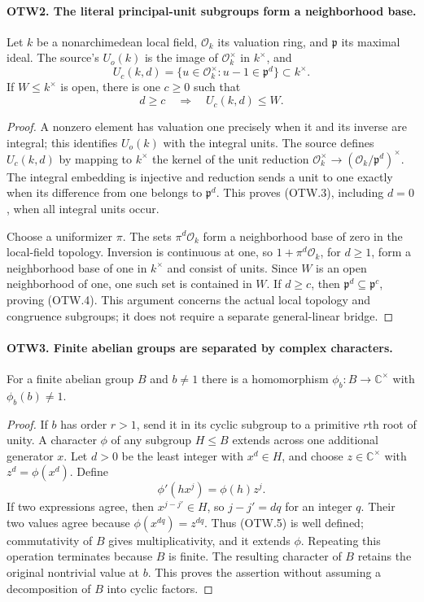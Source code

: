 \paragraph{OTW2. The literal principal-unit subgroups form a neighborhood base.}
\label{claim:OTW2}
Let $k$ be a nonarchimedean local field, $\mathcal O_k$ its valuation
ring, and $\mathfrak p$ its maximal ideal.  The source's $U_o(k)$
is the image of $\mathcal O_k^\times$ in $k^\times$, and
\[
 U_c(k,d)=\{u\in\mathcal O_k^\times:u-1\in\mathfrak p^d\}
                  \subset k^\times.                 \tag{OTW.3}
\]
If $W\leq k^\times$ is open, there is one $c\geq0$ such that
\[
                d\geq c\quad\Longrightarrow\quad U_c(k,d)\leq W.
                \tag{OTW.4}
\]
\begin{proof}
A nonzero element has valuation one precisely when it and its inverse
are integral; this identifies $U_o(k)$ with the integral units.
The source defines $U_c(k,d)$ by mapping to $k^\times$ the kernel
of the unit reduction
$\mathcal O_k^\times\to(\mathcal O_k/\mathfrak p^d)^\times$.
The integral embedding is injective and reduction sends a unit to
one exactly when its difference from one belongs to $\mathfrak p^d$.
This proves (OTW.3), including $d=0$, when all integral units occur.

Choose a uniformizer $\pi$.  The sets $\pi^d\mathcal O_k$ form
a neighborhood base of zero in the local-field topology.  Inversion
is continuous at one, so $1+\pi^d\mathcal O_k$, for $d\geq1$,
form a neighborhood base of one in $k^\times$ and consist of
units.  Since $W$ is an open neighborhood of one, one such set is
contained in $W$.  If $d\geq c$, then
$\mathfrak p^d\subseteq\mathfrak p^c$, proving (OTW.4).
This argument concerns the actual local topology and congruence
subgroups; it does not require a separate general-linear bridge.
\end{proof}

\paragraph{OTW3. Finite abelian groups are separated by complex characters.}
\label{claim:OTW3}
For a finite abelian group $B$ and $b\ne1$ there is a homomorphism
$\phi_b:B\to\mathbb C^\times$ with $\phi_b(b)\ne1$.
\begin{proof}
If $b$ has order $r>1$, send it in its cyclic subgroup to a primitive
$r$th root of unity.  A character $\phi$ of any subgroup $H\leq B$
extends across one additional generator $x$.  Let $d>0$ be the least
integer with $x^d\in H$, and choose $z\in\mathbb C^\times$ with
$z^d=\phi(x^d)$.  Define
\[
                   \phi'(h x^j)=\phi(h)z^j.
                   \tag{OTW.5}
\]
If two expressions agree, then $x^{j-j'}\in H$, so
$j-j'=dq$ for an integer $q$.  Their two values agree because
$\phi(x^{dq})=z^{dq}$.  Thus (OTW.5) is well defined; commutativity
of $B$ gives multiplicativity, and it extends $\phi$.
Repeating this operation terminates because $B$ is finite.
The resulting character of $B$ retains the original nontrivial value
at $b$.  This proves the assertion without assuming a decomposition
of $B$ into cyclic factors.
\end{proof}

